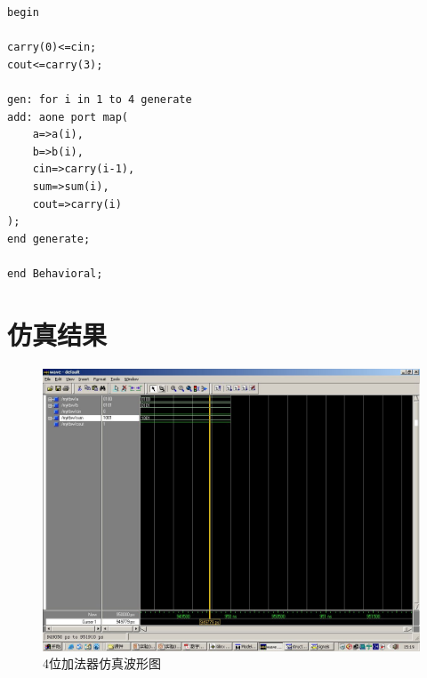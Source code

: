 \documentclass{article}
\begin{document}
\begin{CJK*}{UTF8}{gbsn}
\begin{center}
\begin{lstlisting}[caption = {4位加法器代码清单}, label = {lst: addernlst}]
begin

carry(0)<=cin;
cout<=carry(3);

gen: for i in 1 to 4 generate
add: aone port map(
	a=>a(i),
	b=>b(i),
	cin=>carry(i-1),
	sum=>sum(i),
	cout=>carry(i)
);	   
end generate;

end Behavioral;
\end{lstlisting}
\end{center}

\section{仿真结果}
\begin{center}
\begin{figure}[h!]
\includegraphics[width=\textwidth]{adder.jpg}
\caption{4位加法器仿真波形图}
\label{fig: cfig}
\end{figure}
\end{center}

\end{CJK*}
\end{document}
